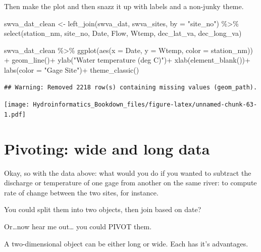 \documentclass[
]{book}
\newenvironment{Shaded}{\begin{snugshade}}{\end{snugshade}}
\newcommand{\AttributeTok}[1]{\textcolor[rgb]{0.77,0.63,0.00}{#1}}
\newcommand{\FunctionTok}[1]{\textcolor[rgb]{0.00,0.00,0.00}{#1}}
\newcommand{\NormalTok}[1]{#1}
\newcommand{\OtherTok}[1]{\textcolor[rgb]{0.56,0.35,0.01}{#1}}
\newcommand{\SpecialCharTok}[1]{\textcolor[rgb]{0.00,0.00,0.00}{#1}}
\newcommand{\StringTok}[1]{\textcolor[rgb]{0.31,0.60,0.02}{#1}}
\begin{document}
Then make the plot and then snazz it up with labels and a non-junky theme.

\begin{Shaded}
\begin{Highlighting}[]
\NormalTok{swva\_dat\_clean }\OtherTok{\textless{}{-}} \FunctionTok{left\_join}\NormalTok{(swva\_dat, swva\_sites, }\AttributeTok{by =} \StringTok{"site\_no"}\NormalTok{) }\SpecialCharTok{\%\textgreater{}\%}
  \FunctionTok{select}\NormalTok{(station\_nm, site\_no, Date, Flow, Wtemp, dec\_lat\_va, dec\_long\_va)}

\NormalTok{swva\_dat\_clean }\SpecialCharTok{\%\textgreater{}\%} \FunctionTok{ggplot}\NormalTok{(}\FunctionTok{aes}\NormalTok{(}\AttributeTok{x =}\NormalTok{ Date, }\AttributeTok{y =}\NormalTok{ Wtemp, }\AttributeTok{color =}\NormalTok{ station\_nm)) }\SpecialCharTok{+}
  \FunctionTok{geom\_line}\NormalTok{()}\SpecialCharTok{+}
  \FunctionTok{ylab}\NormalTok{(}\StringTok{"Water temperature (deg C)"}\NormalTok{)}\SpecialCharTok{+}
  \FunctionTok{xlab}\NormalTok{(}\FunctionTok{element\_blank}\NormalTok{())}\SpecialCharTok{+}
  \FunctionTok{labs}\NormalTok{(}\AttributeTok{color =} \StringTok{"Gage Site"}\NormalTok{)}\SpecialCharTok{+}
  \FunctionTok{theme\_classic}\NormalTok{()}
\end{Highlighting}
\end{Shaded}

\begin{verbatim}
## Warning: Removed 2218 row(s) containing missing values (geom_path).
\end{verbatim}

\texttt{[image: Hydroinformatics\_Bookdown\_files/figure-latex/unnamed-chunk-63-1.pdf]}

\hypertarget{pivoting-wide-and-long-data}{%
\section{Pivoting: wide and long data}\label{pivoting-wide-and-long-data}}

Okay, so with the data above: what would you do if you wanted to subtract the discharge or temperature of one gage from another on the same river: to compute rate of change between the two sites, for instance.

You could split them into two objects, then join based on date?

Or\ldots now hear me out\ldots{} you could PIVOT them.

A two-dimensional object can be either long or wide. Each has it's advantages.
\end{document}
